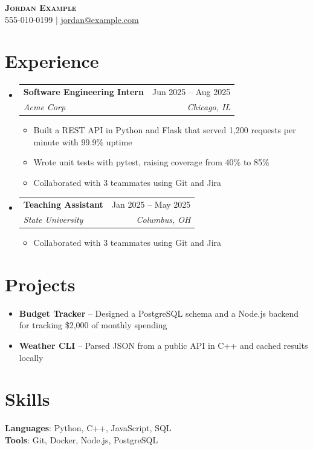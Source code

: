 \documentclass[letterpaper,11pt]{article}
\makeatletter
\newcommand{\resumeItem}[1]{\item\small{#1 \vspace{-2pt}}}
\newcommand{\resumeSubheading}[4]{
  \item
  \begin{tabular*}{\textwidth}[t]{l@{\extracolsep{\fill}}r}
    \textbf{#1} & #2 \\
    \textit{\small#3} & \textit{\small #4} \\
  \end{tabular*}\vspace{-7pt}
}
\newcommand{\resumeSubHeadingListStart}{\begin{itemize}[leftmargin=0.15in, label={}]}
\newcommand{\resumeSubHeadingListEnd}{\end{itemize}}
\newcommand{\resumeItemListStart}{\begin{itemize}}
\newcommand{\resumeItemListEnd}{\end{itemize}\vspace{-5pt}}
\makeatother
\begin{document}
\begin{center}
  \textbf{\Huge \scshape Jordan Example} \\ \vspace{1pt}
  \small 555-010-0199 $|$ \href{mailto:jordan@example.com}{jordan@example.com}
\end{center}

\section{Experience}
\resumeSubHeadingListStart
  \resumeSubheading{Software Engineering Intern}{Jun 2025 -- Aug 2025}{Acme Corp}{Chicago, IL}
  \resumeItemListStart
    \resumeItem{Built a REST API in Python and Flask that served 1,200 requests per minute with 99.9\% uptime}
    \resumeItem{Wrote unit tests with pytest, raising coverage from 40\% to 85\%}
    \resumeItem{Collaborated with 3 teammates using Git and Jira}
  \resumeItemListEnd
  \resumeSubheading{Teaching Assistant}{Jan 2025 -- May 2025}{State University}{Columbus, OH}
  \resumeItemListStart
    \resumeItem{Collaborated with 3 teammates using Git and Jira}
  \resumeItemListEnd
\resumeSubHeadingListEnd

\section{Projects}
\begin{itemize}[leftmargin=0.15in]
  \item \textbf{Budget Tracker} -- Designed a PostgreSQL schema and a Node.js backend for tracking \$2,000 of monthly spending
  \item \textbf{Weather CLI} -- Parsed JSON from a public API in C++ and cached results locally
\end{itemize}

\section{Skills}
\textbf{Languages}: Python, C++, JavaScript, SQL \\
\textbf{Tools}: Git, Docker, Node.js, PostgreSQL
\end{document}
